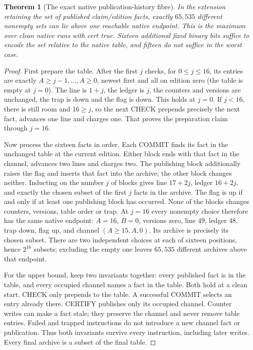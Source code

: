 \documentclass[11pt,twoside]{article}
\theoremstyle{thielethm}
\newtheorem{theorem}{Theorem}[section]
\theoremstyle{thieledef}
\theoremstyle{thieledef}
\theoremstyle{thieledef}
\theoremstyle{thielethm}
\theoremstyle{thieleobs}
\theoremstyle{thielethm}
\begin{document}
\begin{theorem}[The exact native publication-history fibre]\label{thm:native-history-fibre}
In the extension retaining the set of published claim/edition facts, exactly $65{,}535$
different nonempty sets can lie above one reachable native endpoint. This is the maximum
over clean native runs with cert true. Sixteen additional fixed binary bits suffice to
encode the set relative to the native table, and fifteen do not suffice in the worst case.
\end{theorem}
\begin{proof}
First prepare the table. After the first $j$ checks, for $0\le j\le16$, its entries
are exactly $A\ge j-1,\ldots,A\ge0$, newest first and all on edition zero
(the table is empty at $j=0$). The line
is $1+j$, the ledger is $j$, the counters and versions are unchanged, the trap is down
and the flag is down. This holds at $j=0$. If $j<16$, there is still room and $16\ge j$,
so the next CHECK prepends precisely the next fact, advances one line and charges one.
That proves the preparation claim through $j=16$.

Now process the sixteen facts in order. Each COMMIT finds its fact in the unchanged
table at the current edition. Either block ends with that fact in the channel,
advances two lines and charges two. The publishing block additionally raises the flag
and inserts that fact into the archive; the other block changes neither. Inducting on
the number $j$ of blocks gives line $17+2j$, ledger $16+2j$, and exactly the chosen
subset of the first $j$ facts in the archive. The flag is up if and only if at least
one publishing block has occurred. None of the blocks changes counters, versions,
table order or trap. At $j=16$ every nonempty choice therefore has the same native
endpoint: $A=16$, $B=0$, versions zero, line $49$, ledger $48$, trap down, flag up,
and channel $(A\ge15,A,0)$. Its archive is precisely its chosen subset.
There are two independent choices at each of sixteen positions, hence $2^{16}$ subsets;
excluding the empty one leaves $65{,}535$ different archives above that endpoint.

For the upper bound, keep two invariants together: every published fact is in the
table, and every occupied channel names a fact in the table. Both hold at a clean
start. CHECK only prepends to the table. A successful COMMIT selects an entry already
there. CERTIFY publishes only its occupied channel. Counter writes can make a fact
stale; they preserve the channel and never remove table entries. Failed and trapped instructions
do not introduce a new channel fact or publication. Thus both invariants survive every
instruction, including later writes. Every final archive is a subset of the final table.


\end{proof}
\end{document}
